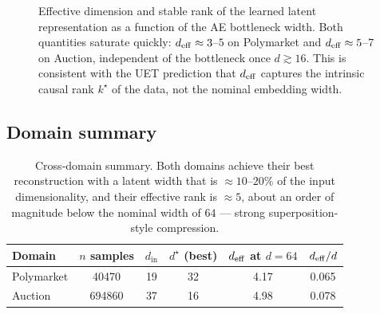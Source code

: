 \begin{figure}[H]
\centering
{}
\caption{Effective dimension and stable rank of the learned latent
representation as a function of the AE bottleneck width. Both quantities
saturate quickly: $d_{\mathrm{eff}} \approx 3$--$5$ on Polymarket and
$d_{\mathrm{eff}} \approx 5$--$7$ on Auction, independent of the bottleneck once
$d \gtrsim 16$. This is consistent with the UET prediction that $d_{\mathrm{eff}}$
captures the intrinsic causal rank $k^\star$ of the data, not the nominal
embedding width.}
\label{fig:cross-domain}
\end{figure}

\subsection{Domain summary}

\begin{table}[H]
\centering
\small
\begin{tabular}{lSSSSS}
\toprule
Domain & {$n$ samples} & {$d_{\text{in}}$} & {$d^\star$ (best)} & {$d_{\mathrm{eff}}$ at $d{=}64$} & {$d_{\mathrm{eff}}/d$} \\
\midrule
Polymarket & 40470  & 19 & 32 & 4.17 & 0.065 \\
Auction    & 694860 & 37 & 16 & 4.98 & 0.078 \\
\bottomrule
\end{tabular}
\caption{Cross-domain summary. Both domains achieve their best
reconstruction with a latent width that is $\approx 10$--$20\%$ of the
input dimensionality, and their effective rank is $\approx 5$, about an
order of magnitude below the nominal width of $64$ --- strong
superposition-style compression.}
\label{tab:cross-domain}
\end{table}

